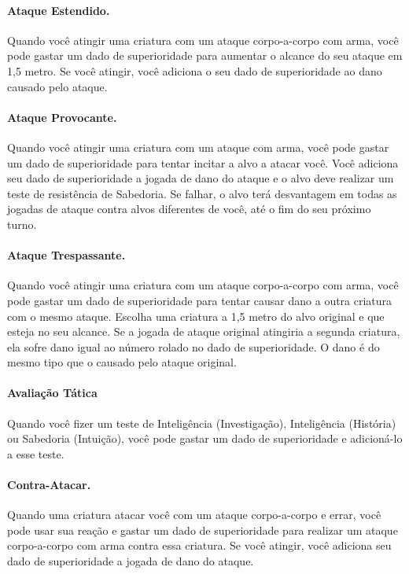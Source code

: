 \documentclass{RPG_Adventure}[2021/10/20]
\begin{document}
\paragraph{Ataque Estendido.} Quando você atingir uma criatura com um ataque
corpo-a-corpo com arma, você pode gastar um dado de superioridade para aumentar
o alcance do seu ataque em 1,5 metro. Se você atingir, você adiciona o seu dado
de superioridade ao dano causado pelo ataque.

\paragraph{Ataque Provocante.} Quando você atingir uma criatura com um ataque
com arma, você pode gastar um dado de superioridade para tentar incitar a alvo a
atacar você. Você adiciona seu dado de superioridade a jogada de dano do ataque
e o alvo deve realizar um teste de resistência de Sabedoria. Se falhar, o alvo
terá desvantagem em todas as jogadas de ataque contra alvos diferentes de você,
até o fim do seu próximo turno.

\paragraph{Ataque Trespassante.} Quando você atingir uma criatura com um ataque
corpo-a-corpo com arma, você pode gastar um dado de superioridade para tentar
causar dano a outra criatura com o mesmo ataque. Escolha uma criatura a 1,5
metro do alvo original e que esteja no seu alcance. Se a jogada de ataque
original atingiria a segunda criatura, ela sofre dano igual ao número rolado no
dado de superioridade. O dano é do mesmo tipo que o causado pelo ataque
original.

\paragraph{Avaliação Tática} Quando você fizer um teste de Inteligência
(Investigação), Inteligência (História) ou Sabedoria (Intuição), você pode
gastar um dado de superioridade e adicioná-lo a esse teste.

\paragraph{Contra-Atacar.} Quando uma criatura atacar você com um ataque
corpo-a-corpo e errar, você pode usar sua reação e gastar um dado de
superioridade para realizar um ataque corpo-a-corpo com arma contra essa
criatura.  Se você atingir, você adiciona seu dado de superioridade a jogada de
dano do ataque.
\end{document}
